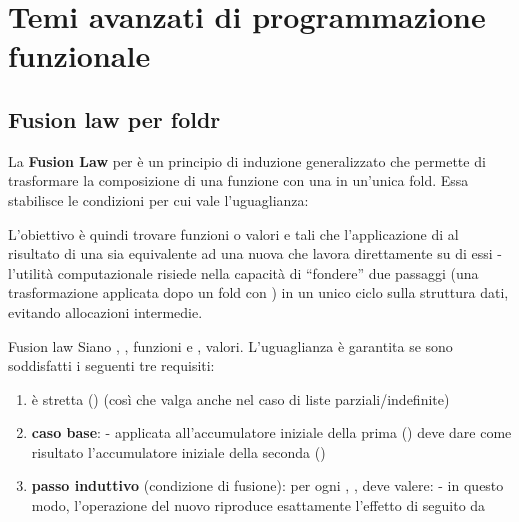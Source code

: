 \chapter{Temi avanzati di programmazione funzionale}

\section{Fusion law per foldr}

La \textbf{Fusion Law} per  è un principio di induzione generalizzato che permette di trasformare la composizione di una funzione con una  in un'unica fold. Essa stabilisce le condizioni per cui vale l'uguaglianza:


L'obiettivo è quindi trovare funzioni o valori  e  tali che l'applicazione di  al risultato di una  sia equivalente ad una nuova  che lavora direttamente su di essi - l'utilità computazionale risiede nella capacità di ``fondere'' due passaggi (una trasformazione  applicata dopo un fold con ) in un unico ciclo sulla struttura dati, evitando allocazioni intermedie.

\begin{thmframe}{Fusion law}{}
    Siano , ,  funzioni e ,  valori. L'uguaglianza  è garantita se sono soddisfatti i seguenti tre requisiti:
    \begin{enumerate}
        \item {} è stretta () (così che valga anche nel caso di liste parziali/indefinite)
        \item \textbf{caso base}:  -  applicata all'accumulatore iniziale della prima  () deve dare come risultato l'accumulatore iniziale della seconda ()
        \item \textbf{passo induttivo} (condizione di fusione): per ogni , , deve valere: 
            \subitem {} - in questo modo, l'operazione  del nuovo  riproduce esattamente l'effetto di  seguito da 
    \end{enumerate}

\end{thmframe}

